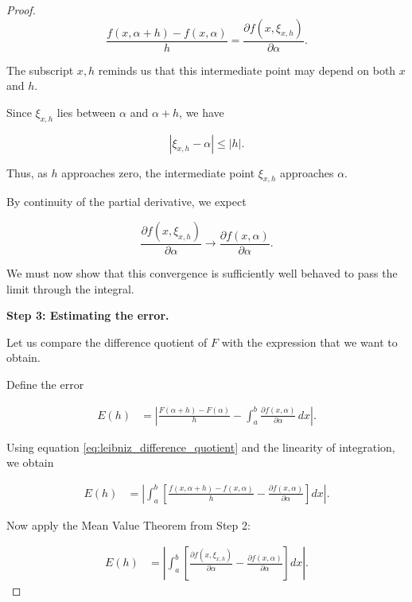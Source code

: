 \documentclass[11pt,a4paper]{article}
\theoremstyle{definition}
\theoremstyle{remark}
\begin{document}
\begin{proof}
\begin{equation}
    \frac{f(x,\alpha+h)-f(x,\alpha)}
         {h}
    =
    \frac{\partial f(x,\xi_{x,h})}
         {\partial\alpha}.
    \label{eq:leibniz_mvt}
\end{equation}

The subscript $x,h$ reminds us
that this intermediate point
may depend on both $x$ and $h$.

Since $\xi_{x,h}$ lies between
$\alpha$ and $\alpha+h$, we have

\begin{equation}
    |\xi_{x,h}-\alpha|
    \leq |h|.
    \label{eq:leibniz_xi_bound}
\end{equation}

Thus, as $h$ approaches zero,
the intermediate point
$\xi_{x,h}$ approaches $\alpha$.

By continuity of the partial
derivative, we expect

\[
    \frac{\partial f(x,\xi_{x,h})}
         {\partial\alpha}
    \longrightarrow
    \frac{\partial f(x,\alpha)}
         {\partial\alpha}.
\]

We must now show that this
convergence is sufficiently
well behaved to pass the limit
through the integral.

\medskip

\textbf{Step 3: Estimating the error.}

Let us compare the difference
quotient of $F$ with the
expression that we want
to obtain.

Define the error

\begin{align}
    E(h)
    &=
    \left|
    \frac{F(\alpha+h)-F(\alpha)}{h}
    -
    \int_a^b
    \frac{\partial f(x,\alpha)}
         {\partial\alpha}\,dx
    \right|.
    \label{eq:leibniz_error}
\end{align}

Using equation
\eqref{eq:leibniz_difference_quotient}
and the linearity of
integration, we obtain

\begin{align}
    E(h)
    &=
    \left|
    \int_a^b
    \left[
    \frac{f(x,\alpha+h)-f(x,\alpha)}{h}
    -
    \frac{\partial f(x,\alpha)}
         {\partial\alpha}
    \right]dx
    \right|.
\end{align}

Now apply the Mean Value
Theorem from Step 2:

\begin{align}
    E(h)
    &=
    \left|
    \int_a^b
    \left[
    \frac{\partial f(x,\xi_{x,h})}
         {\partial\alpha}
    -
    \frac{\partial f(x,\alpha)}
         {\partial\alpha}
    \right]dx
    \right|.
\end{align}


\end{proof}
\end{document}
